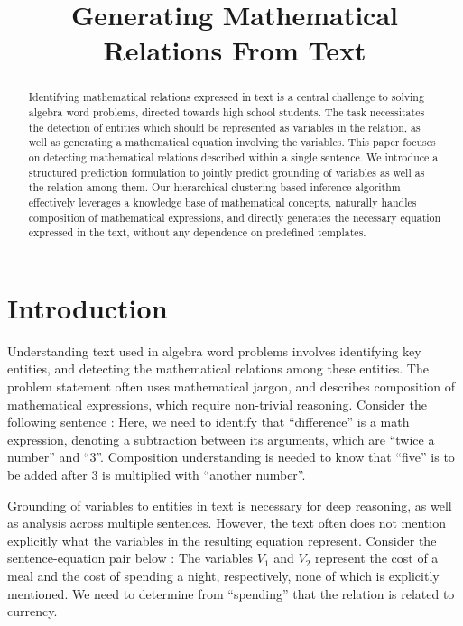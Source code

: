 \documentclass[11pt]{article}
\title{Generating Mathematical Relations From Text}
\date{}
\begin{document}
\maketitle
\begin{abstract}
  Identifying mathematical relations expressed in text is a central
  challenge to solving algebra word problems, directed towards high
  school students. The task necessitates the detection of entities
  which should be represented as variables in the relation, as well as
  generating a mathematical equation involving the variables. This
  paper focuses on detecting mathematical relations described within a
  single sentence. We introduce a structured prediction formulation to
  jointly predict grounding of variables as well as the relation among
  them. Our hierarchical clustering based inference algorithm
  effectively leverages a knowledge base of mathematical concepts,
  naturally handles composition of mathematical expressions, and
  directly generates the necessary equation expressed in the text,
  without any dependence on predefined templates.
\end{abstract}

\section{Introduction}
  Understanding text used in algebra word problems involves
  identifying key entities, and detecting the mathematical relations
  among these entities. The problem statement often uses mathematical
  jargon, and describes composition of mathematical expressions, which
  require non-trivial reasoning. Consider the following sentence :
  \noindent
  Here, we need to identify that ``difference'' is a math expression,
  denoting a subtraction between its arguments, which are ``twice a
  number'' and ``3''. Composition understanding is needed to know that
  ``five'' is to be added after $3$ is multiplied with ``another
  number''.

  Grounding of variables to entities in text is necessary for deep
  reasoning, as well as analysis across multiple sentences. However,
  the text often does not mention explicitly what the variables in the
  resulting equation represent. Consider the sentence-equation pair
  below :
  \noindent
  The variables $V_1$ and $V_2$ represent the cost of a meal and the
  cost of spending a night, respectively, none of which is explicitly
  mentioned. We need to determine from ``spending'' that the relation
  is related to currency.
\end{document}

